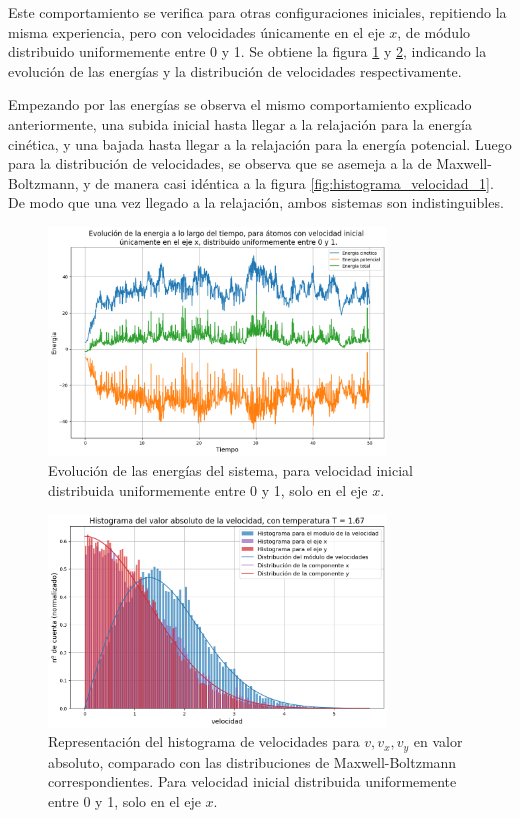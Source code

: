 \documentclass[11pt, twoside]{article} %
\begin{document}
Este comportamiento se verifica para otras configuraciones iniciales, repitiendo la 
misma experiencia, pero con velocidades únicamente en el eje $x$, de módulo distribuido
uniformemente entre 0 y 1. Se obtiene la figura \ref{fig:apartado_2_energia_x} y 
\ref{fig:histograma_velocidad_x}, indicando la evolución de las energías y la distribución
de velocidades respectivamente.

Empezando por las energías se observa el mismo comportamiento explicado anteriormente, una 
subida inicial hasta llegar a la relajación para la energía cinética, y una bajada hasta 
llegar a la relajación para la energía potencial. Luego para la distribución de velocidades,
se observa que se asemeja a la de Maxwell-Boltzmann, y de manera casi idéntica a la 
figura \ref{fig:histograma_velocidad_1}. De modo que una vez llegado a la relajación,
ambos sistemas son indistinguibles.


\begin{figure}[h!]
    \centering
    \includegraphics[width=0.8\textwidth]{plots/apartado_2_energia_x.png}
    \caption{Evolución de las energías del sistema, para velocidad inicial distribuida 
    uniformemente entre 0 y 1, solo en el eje $x$.}
    \label{fig:apartado_2_energia_x}
\end{figure}

\begin{figure}[h!]
    \centering
    \includegraphics[width=0.8\textwidth]{plots/histograma_velocidad_x.png}
    \caption{Representación del histograma de velocidades para $v, v_x, v_y$ en valor
    absoluto, comparado con las distribuciones de Maxwell-Boltzmann correspondientes. 
    Para velocidad inicial distribuida uniformemente entre 0 y 1, solo en el eje $x$.}
    \label{fig:histograma_velocidad_x}
\end{figure}
\end{document}
